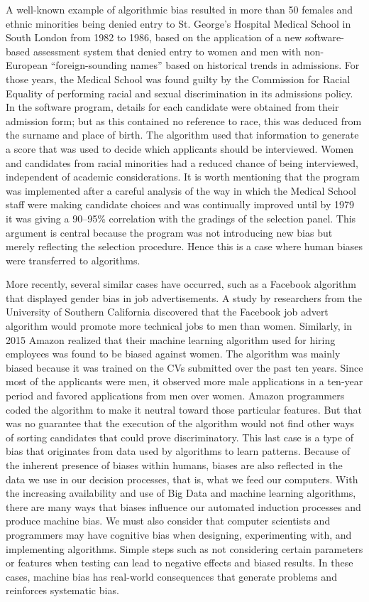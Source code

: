 A well-known example of algorithmic bias resulted in more than 50 females and ethnic minorities being denied entry to St. George's Hospital Medical School in South London from 1982 to 1986, based on the application of a new software-based assessment system that denied entry to women and men with non-European ``foreign-sounding names'' based on historical trends in admissions. For those years, the Medical School was found guilty by the Commission for Racial Equality of performing racial and sexual discrimination in its admissions policy. In the software program, details for each candidate were obtained from their admission form; but as this contained no reference to race, this was deduced from the surname and place of birth. The algorithm used that information to generate a score that was used to decide which applicants should be interviewed. Women and candidates from racial minorities had a reduced chance of being interviewed, independent of academic considerations. It is worth mentioning that the program was implemented after a careful analysis of the way in which the Medical School staff were making candidate choices and was continually improved until by 1979 it was \hbox{giving} a 90--95\% correlation with the gradings of the selection panel. This argument is central because the program was not introducing new bias but merely reflecting the selection procedure. Hence this is a case where human biases were transferred to algorithms.

More recently, several similar cases have occurred, such as a Facebook algorithm that displayed gender bias in job advertisements. A study by researchers from the University of Southern California discovered that the Facebook job advert \hbox{algorithm} would promote more technical jobs to men than women. Similarly, in 2015 Amazon realized that their machine learning algorithm used for hiring employees was found to be biased against women. The algorithm was mainly biased because it was trained on the CVs submitted over the past ten years. Since most of the applicants were men, it observed more male applications in a ten-year period and favored applications from men over women. Amazon programmers coded the algorithm to make it neutral toward those particular features. But that was no guarantee that the execution of the algorithm would not find other ways of sorting candidates that could prove discriminatory. This last case is a type of bias that originates from data used by algorithms to learn patterns. Because of the inherent presence of biases within humans, biases are also reflected in the data we use in our decision processes, that is, what we feed our computers. With the increasing availability and use of Big Data and machine learning algorithms, there are many ways that biases influence our automated induction processes and produce machine bias. We must also consider that computer scientists and programmers may have cognitive bias when designing, experimenting with, and implementing algorithms. Simple steps such as not considering certain \hbox{parameters} or features when testing can lead to negative effects and biased results. In these cases, machine bias has real-world consequences that generate problems and reinforces systematic bias.

